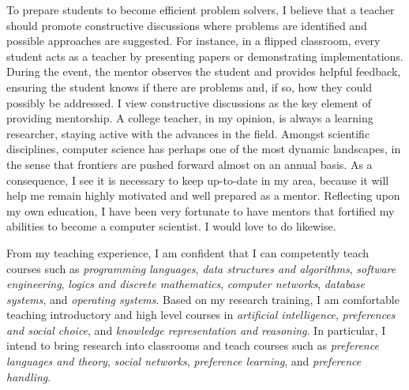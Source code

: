 \documentclass[12pt]{article}
\newcommand{\tit}[1]{\textit{#1}}
\begin{document}
To prepare students to become efficient problem solvers, 
I believe that a teacher should promote
constructive discussions where problems are identified and possible approaches are suggested.
For instance, in a flipped classroom, every student acts as a teacher by presenting papers
or demonstrating implementations.  During the event, the mentor observes the student and
provides helpful feedback, ensuring the student knows if there are problems and, if so,
how they could possibly be addressed.
I view constructive discussions as the key element of providing mentorship.
A college teacher, in my opinion, is always a learning researcher, staying
active with the advances in the field.
Amongst scientific disciplines,
computer science has perhaps one of the most dynamic landscapes, in the sense that
frontiers are pushed forward almost on an annual basis.
As a consequence, I see it is necessary to keep up-to-date in my area,
because it will help me remain highly motivated and well prepared as a mentor.
Reflecting upon my own education, I have been very fortunate to have mentors
that fortified my abilities to become a computer scientist.
I would love to do likewise.

From my teaching experience, I am confident that I can competently teach courses such as
\tit{programming languages}, \tit{data structures and algorithms}, \tit{software engineering},
\tit{logics and discrete mathematics},
\tit{computer networks}, \tit{database systems}, and \tit{operating systems}.
Based on my research training, I am comfortable teaching introductory and high 
level courses in \tit{artificial intelligence},
\tit{preferences and social choice}, and \tit{knowledge representation and reasoning}.
In particular, I intend to bring research into classrooms and teach courses such as
\tit{preference languages and theory}, \tit{social networks},
\tit{preference learning}, and \tit{preference handling}.
\end{document}
